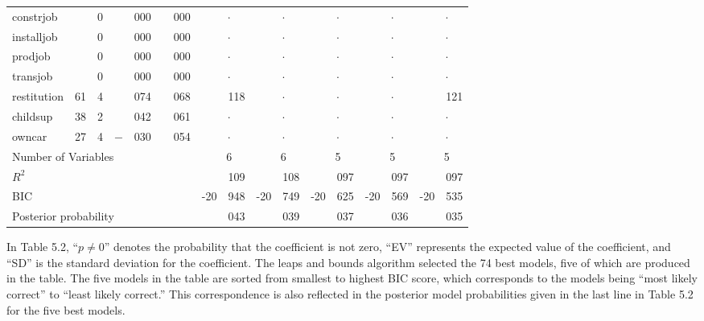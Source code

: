\begin{table}[t]
\begin{center}
\begin{tabular}{lr@{.}lr@{.}lr@{.}lr@{.}lr@{.}lr@{.}lr@{.}lr@{.}l}
constrjob   &     & 0 &   & 000 &   & 000 & \multicolumn{2}{c}{\ \ $\cdot$} & \multicolumn{2}{c}{\ \ $\cdot$} & \multicolumn{2}{c}{\ \ $\cdot$} & \multicolumn{2}{c}{\ \ $\cdot$} & \multicolumn{2}{c}{\ \ $\cdot$} \\
installjob  &     & 0 &   & 000 &   & 000 & \multicolumn{2}{c}{\ \ $\cdot$} & \multicolumn{2}{c}{\ \ $\cdot$} & \multicolumn{2}{c}{\ \ $\cdot$} & \multicolumn{2}{c}{\ \ $\cdot$} & \multicolumn{2}{c}{\ \ $\cdot$} \\
prodjob     &     & 0 &   & 000 &   & 000 & \multicolumn{2}{c}{\ \ $\cdot$} & \multicolumn{2}{c}{\ \ $\cdot$} & \multicolumn{2}{c}{\ \ $\cdot$} & \multicolumn{2}{c}{\ \ $\cdot$} & \multicolumn{2}{c}{\ \ $\cdot$} \\
transjob    &     & 0 &   & 000 &   & 000 & \multicolumn{2}{c}{\ \ $\cdot$} & \multicolumn{2}{c}{\ \ $\cdot$} & \multicolumn{2}{c}{\ \ $\cdot$} & \multicolumn{2}{c}{\ \ $\cdot$} & \multicolumn{2}{c}{\ \ $\cdot$} \\
restitution  &  61 & 4 &   & 074 &   & 068 &   & 118 & \multicolumn{2}{c}{\ \ $\cdot$} & \multicolumn{2}{c}{\ \ $\cdot$}  &  \multicolumn{2}{c}{\ \ $\cdot$}  &   & 121 \\
childsup   &  38 & 2 &   & 042 &   & 061 & \multicolumn{2}{c}{\ \ $\cdot$} & \multicolumn{2}{c}{\ \ $\cdot$} & \multicolumn{2}{c}{\ \ $\cdot$} & \multicolumn{2}{c}{\ \ $\cdot$} & \multicolumn{2}{c}{\ \ $\cdot$} \\
owncar      &  27 & 4 &$-$& 030 &   & 054 & \multicolumn{2}{c}{\ \ $\cdot$} & \multicolumn{2}{c}{\ \ $\cdot$} & \multicolumn{2}{c}{\ \ $\cdot$} & \multicolumn{2}{c}{\ \ $\cdot$} & \multicolumn{2}{c}{\ \ $\cdot$} \\ \hline
\multicolumn{7}{l}{Number of Variables} & \multicolumn{2}{c}{\ \ 6} & \multicolumn{2}{c}{\ \ 6} & \multicolumn{2}{c}{\ \ 5} &  \multicolumn{2}{c}{\ \ 5} & \multicolumn{2}{c}{\ \ 5} \\
\multicolumn{7}{l}{$R^2$} &  & 109 & & 108 & & 097 & & 097 & & 097 \\
\multicolumn{7}{l}{BIC} & -20 & 948 & -20 & 749 & -20 & 625 & -20 & 569 & -20 & 535 \\
\multicolumn{7}{l}{Posterior probability} & & 043 & & 039 & & 037 & & 036 & & 035 \\
  \hline
\end{tabular}
\normalsize
\end{center}
\end{table}

In Table 5.2, ``$p\neq 0$'' denotes the probability that the coefficient is not zero, ``EV'' represents the expected value of the coefficient, and ``SD'' is the standard deviation for the coefficient.  The leaps and bounds algorithm selected the 74 best models, five of which are produced in the table.  The five models in the table are sorted from smallest to highest BIC score, which corresponds to the models being ``most likely correct'' to ``least likely correct.''  This correspondence is also reflected in the posterior model probabilities given in the last line in Table 5.2 for the five best models.

